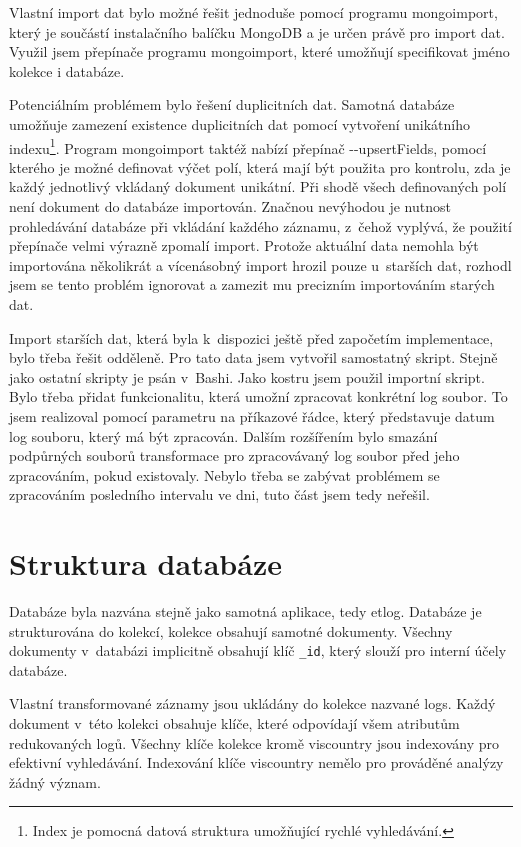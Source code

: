 \documentclass[thesis=M,czech]{FITthesis}[2012/06/26]
\begin{document}
      Vlastní import dat bylo možné řešit jednoduše pomocí programu mongoimport,
      který je součástí instalačního balíčku MongoDB a je určen právě pro import dat.
      Využil jsem přepínače programu mongoimport, 
      které umožňují specifikovat jméno kolekce i databáze.
      
      Potenciálním problémem bylo řešení duplicitních dat.
      Samotná databáze umožňuje zamezení existence duplicitních dat pomocí vytvoření unikátního indexu\footnote{
        Index je pomocná datová struktura umožňující rychlé vyhledávání.
      }.
      Program mongoimport taktéž nabízí přepínač -{}-upsertFields, pomocí kterého je možné definovat
      výčet polí, která mají být použita pro kontrolu, zda je každý jednotlivý vkládaný dokument unikátní.
      Při shodě všech definovaných polí není dokument do databáze importován.
      Značnou nevýhodou je nutnost prohledávání databáze při vkládání každého záznamu,
      z~čehož vyplývá, že použití přepínače velmi výrazně zpomalí import.
      Protože aktuální data nemohla být importována několikrát a vícenásobný import hrozil pouze u~starších dat,
      rozhodl jsem se tento problém ignorovat a zamezit mu precizním importováním starých dat.

      Import starších dat, která byla k~dispozici ještě před započetím implementace, bylo třeba řešit odděleně.
      Pro tato data jsem vytvořil samostatný skript. Stejně jako ostatní skripty je psán v~Bashi.
      Jako kostru jsem použil importní skript.
      Bylo třeba přidat funkcionalitu, která umožní zpracovat konkrétní log soubor. 
      To jsem realizoval pomocí parametru na příkazové řádce, který představuje datum log souboru, který má být zpracován.
      Dalším rozšířením bylo smazání podpůrných souborů transformace 
      pro zpracovávaný log soubor před jeho zpracováním, pokud existovaly.
      Nebylo třeba se zabývat problémem se zpracováním posledního intervalu ve dni, tuto část jsem tedy neřešil.

  \section{Struktura databáze}

    Databáze byla nazvána stejně jako samotná aplikace, tedy etlog.
    Databáze je strukturována do kolekcí, kolekce obsahují samotné dokumenty.
    Všechny dokumenty v~databázi implicitně obsahují klíč \verb|_id|,
    který slouží pro interní účely databáze.

    Vlastní transformované záznamy jsou ukládány do kolekce nazvané logs.
    Každý dokument v~této kolekci obsahuje klíče, které odpovídají všem atributům redukovaných logů.
    Všechny klíče kolekce kromě viscountry jsou indexovány pro efektivní vyhledávání.
    Indexování klíče viscountry nemělo pro prováděné analýzy žádný význam.
\end{document}
